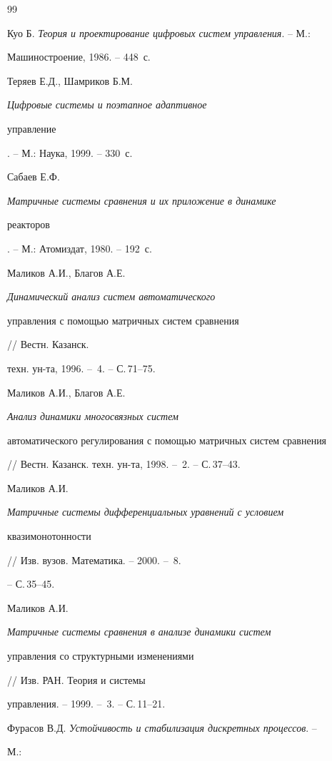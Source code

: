 \begin{thebibliography}{99}







Куо Б. {\em Теория и проектирование цифровых систем управления}. -- М.:


Машиностроение, 1986. -- 448~с.




Теряев Е.Д., Шамриков Б.М. {\em Цифровые системы и поэтапное адаптивное


управление}. -- М.: Наука, 1999. -- 330~с.




Сабаев Е.Ф. {\em Матричные системы сравнения и их приложение в динамике


реакторов}. -- М.: Атомиздат, 1980. -- 192~с.




Маликов А.И., Благов А.Е. {\em Динамический анализ систем автоматического


управления с помощью матричных систем сравнения} // Вестн. Казанск.


техн. ун-та, 1996. -- \No\,4. -- С.\,71--75.




Маликов А.И., Благов А.Е. {\em Анализ динамики многосвязных систем


автоматического регулирования с помощью матричных систем сравнения}


// Вестн. Казанск. техн. ун-та, 1998. -- \No\,2. -- С.\,37--43.




Маликов А.И. {\em Матричные системы дифференциальных уравнений с условием


квазимонотонности} // Изв. вузов. Математика. -- 2000. -- \No\,8.


-- С.\,35--45.




Маликов А.И. {\em Матричные системы сравнения в анализе динамики систем


управления со структурными изменениями} // Изв. РАН. Теория и системы


управления. -- 1999. -- \No\,3. -- С.\,11--21.




Фурасов В.Д. {\em Устойчивость и стабилизация дискретных процессов}. --


М.:



\end{thebibliography}

